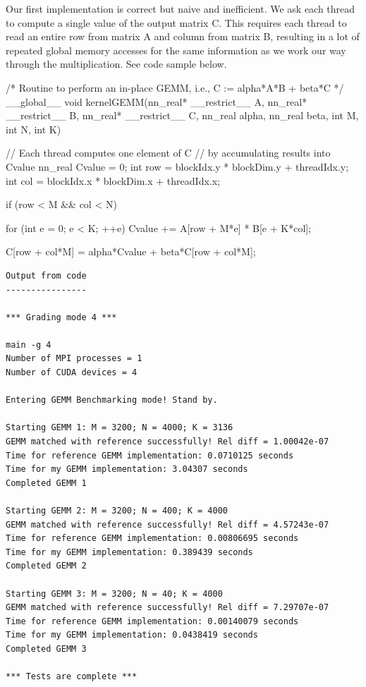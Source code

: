 \documentclass[12pt,letterpaper,twoside]{article}
\begin{document}
Our first implementation is correct but naive and inefficient. We ask each thread to 
compute a single value of the output matrix C. This requires each thread to read an 
entire row from matrix A and column from matrix B, resulting in a lot of repeated 
global memory accesses for the same information as we work our way through the 
multiplication. See code sample below.

\begin{cpp}
/* 
Routine to perform an in-place GEMM, i.e., C := alpha*A*B + beta*C
*/
__global__ 
void kernelGEMM(nn_real* __restrict__ A, nn_real* __restrict__ B, 
        nn_real* __restrict__ C, nn_real alpha, nn_real beta, 
            int M, int N, int K) 
{
    // Each thread computes one element of C
    // by accumulating results into Cvalue
    nn_real Cvalue = 0;
    int row = blockIdx.y * blockDim.y + threadIdx.y;
    int col = blockIdx.x * blockDim.x + threadIdx.x;

    if (row < M && col < N) 
    {
        for (int e = 0; e < K; ++e) 
        Cvalue += A[row + M*e] * B[e +  K*col];	
        
    C[row + col*M] = alpha*Cvalue + beta*C[row + col*M];
    }
}
\end{cpp}

\begin{verbatim}
Output from code
----------------

*** Grading mode 4 ***

main -g 4
Number of MPI processes = 1
Number of CUDA devices = 4

Entering GEMM Benchmarking mode! Stand by.

Starting GEMM 1: M = 3200; N = 4000; K = 3136
GEMM matched with reference successfully! Rel diff = 1.00042e-07
Time for reference GEMM implementation: 0.0710125 seconds
Time for my GEMM implementation: 3.04307 seconds
Completed GEMM 1

Starting GEMM 2: M = 3200; N = 400; K = 4000
GEMM matched with reference successfully! Rel diff = 4.57243e-07
Time for reference GEMM implementation: 0.00806695 seconds
Time for my GEMM implementation: 0.389439 seconds
Completed GEMM 2

Starting GEMM 3: M = 3200; N = 40; K = 4000
GEMM matched with reference successfully! Rel diff = 7.29707e-07
Time for reference GEMM implementation: 0.00140079 seconds
Time for my GEMM implementation: 0.0438419 seconds
Completed GEMM 3

*** Tests are complete ***
\end{verbatim}
\end{document}
